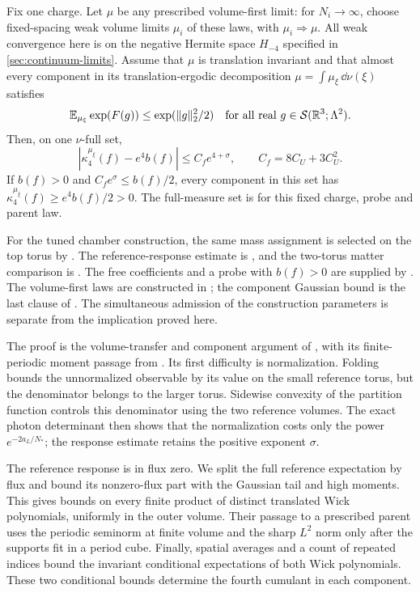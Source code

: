 \begin{theorem}
Fix one charge. Let $\mu$ be any prescribed volume-first limit:
for $N_i\to\infty$, choose fixed-spacing weak volume limits
$\mu_i$ of these laws, with $\mu_i\Rightarrow\mu$.
All weak convergence here is on the negative Hermite space
$H_{-4}$ specified in \cref{sec:continuum-limits}.
Assume that $\mu$ is translation invariant and that almost every
component in its translation-ergodic decomposition
$\mu=\int\mu_\xi\,\dd\nu(\xi)$ satisfies
\begin{equation}\label{eq:vtm-component-G}
 \mathbb E_{\mu_\xi}\exp(F(g))\le\exp(\|g\|_2^2/2)
 \quad\text{for all real }g\in\mathcal S(\mathbb R^3;\Lambda^2).
\end{equation}
Then, on one $\nu$-full set,
\begin{equation}\label{eq:vtm-main-component}
 |\kappa_4^{\mu_\xi}(f)-e^4b(f)|
                    \le C_fe^{4+\sigma},\qquad C_f=8C_U+3C_U^2.
\end{equation}
If $b(f)>0$ and $C_fe^\sigma\le b(f)/2$, every component
in this set has $\kappa_4^{\mu_\xi}(f)\ge e^4b(f)/2>0$.
The full-measure set is for this fixed charge, probe and parent law.
\end{theorem}

For the tuned chamber construction, the same mass assignment
is selected on the top torus by \cite[Theorem~A]{CommonTuning}.
The reference-response estimate is \cite[Theorem~A]{ReferenceResponse},
and the two-torus matter comparison is \cite[Theorem~A]{TerminalPressure}.
The free coefficients and a probe with $b(f)>0$ are supplied by
\cite[Theorems~A--B]{PositiveProbe}. The volume-first laws are
constructed in \cite{ContinuumExistence}; the component Gaussian
bound is the last clause of \cite[Theorem~A]{ContinuumComponents}.
The simultaneous admission of the construction parameters is
separate from the implication proved here.

The proof is the volume-transfer and component argument of
\cite[\S25--26]{QED3Master}, with its finite-periodic moment
passage from \cite[\S6.1--6.2]{QED3Master}.
Its first difficulty is normalization. Folding bounds the
unnormalized observable by its value on the small reference torus,
but the denominator belongs to the larger torus. Sidewise
convexity of the partition function controls this denominator
using the two reference volumes. The exact photon determinant
then shows that the normalization costs only the power
$e^{-2a_L/N_*}$; the response estimate retains the positive
exponent $\sigma$.

The reference response is in flux zero. We split the full
reference expectation by flux and bound its nonzero-flux part
with the Gaussian tail and high moments. This gives bounds on
every finite product of distinct translated Wick polynomials,
uniformly in the outer volume. Their passage to a prescribed
parent uses the periodic seminorm at finite volume and the sharp
$L^2$ norm only after the supports fit in a period cube.
Finally, spatial averages and a count of repeated indices bound
the invariant conditional expectations of both Wick polynomials.
These two conditional bounds determine the fourth cumulant in
each component.

